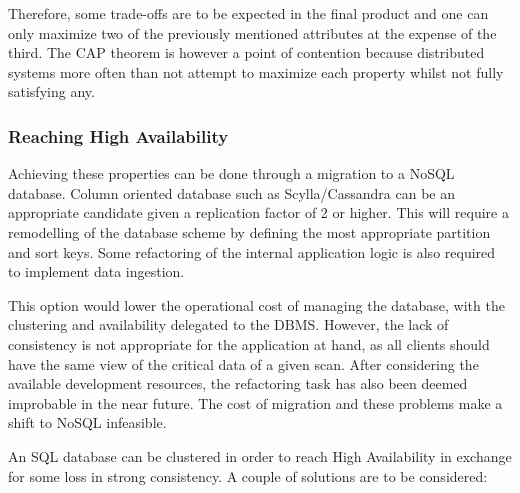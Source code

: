 \documentclass[11pt]{article}
\begin{document}
Therefore, some trade-offs are to be expected in the final product and one can only maximize two of the previously mentioned attributes at the expense of the third. The CAP theorem is however a point of contention because distributed systems more often than not attempt to maximize each property whilst not fully satisfying any. 

\vspace{5mm}
\subsubsection{Reaching High Availability}


\vspace{-5mm}\hspace{5mm} Achieving these properties can be done through a migration to a NoSQL database. Column oriented database such as Scylla/Cassandra can be an appropriate candidate given a replication factor of 2 or higher. This will require a remodelling of the database scheme by defining the most appropriate partition and sort keys. Some refactoring of the internal application logic is also required to implement data ingestion. 

This option would lower the operational cost of managing the database, with the clustering and availability delegated to the DBMS. However, the lack of consistency is not appropriate for the application at hand, as all clients should have the same view of the critical data of a given scan. After considering the available development resources, the refactoring task has also been deemed improbable in the near future. The cost of migration and these problems make a shift to NoSQL infeasible.

\vspace{3mm}

\vspace{-5mm} An SQL database can be clustered in order to reach High Availability in exchange for some loss in strong consistency. A couple of solutions are to be considered:
\end{document}
